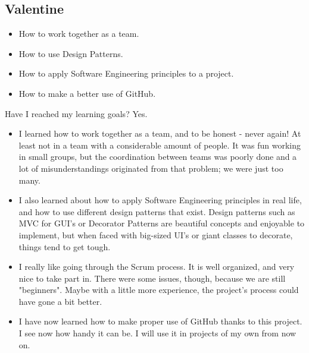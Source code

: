 \subsection*{Valentine}
\begin{itemize}
	\item How to work together as a team.
	\item How to use Design Patterns.
	\item How to apply Software Engineering principles to a project.
	\item How to make a better use of GitHub.
\end{itemize}

Have I reached my learning goals? Yes. 
\begin{itemize}
    \item I learned how to work together as a team, and to be honest - never again! At least not in a team with a considerable amount of people. It was fun working in small groups, but the coordination between teams was poorly done and a lot of misunderstandings originated from that problem; we were just too many. 
    \item I also learned about how to apply Software Engineering principles in real life, and how to use different design patterns that exist. Design patterns such as MVC for GUI's or Decorator Patterns are beautiful concepts and enjoyable to implement, but when faced with big-sized UI's or giant classes to decorate, things tend to get tough. 
    \item I really like going through the Scrum process. It is well organized, and very nice to take part in. There were some issues, though, because we are still "beginners". Maybe with a little more experience, the project's process could have gone a bit better.
    \item I have now learned how to make proper use of GitHub thanks to this project. I see now how handy it can be. I will use it in projects of my own from now on. 
\end{itemize}